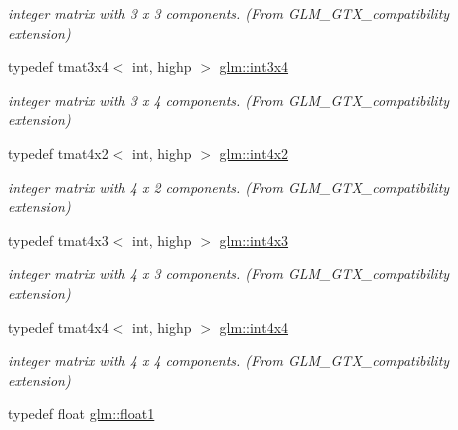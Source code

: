 \begin{DoxyCompactItemize}
\begin{DoxyCompactList}\small\item\em integer matrix with 3 x 3 components. (From G\-L\-M\-\_\-\-G\-T\-X\-\_\-compatibility extension) \end{DoxyCompactList}\item 
\hypertarget{group__gtx__compatibility_ga7500192cce87fb3a48f7119d6646af5a}{typedef tmat3x4$<$ int, highp $>$ \hyperlink{group__gtx__compatibility_ga7500192cce87fb3a48f7119d6646af5a}{glm\-::int3x4}}\label{group__gtx__compatibility_ga7500192cce87fb3a48f7119d6646af5a}

\begin{DoxyCompactList}\small\item\em integer matrix with 3 x 4 components. (From G\-L\-M\-\_\-\-G\-T\-X\-\_\-compatibility extension) \end{DoxyCompactList}\item 
\hypertarget{group__gtx__compatibility_ga91c24f1a2df5d20ea98f97ec243782c3}{typedef tmat4x2$<$ int, highp $>$ \hyperlink{group__gtx__compatibility_ga91c24f1a2df5d20ea98f97ec243782c3}{glm\-::int4x2}}\label{group__gtx__compatibility_ga91c24f1a2df5d20ea98f97ec243782c3}

\begin{DoxyCompactList}\small\item\em integer matrix with 4 x 2 components. (From G\-L\-M\-\_\-\-G\-T\-X\-\_\-compatibility extension) \end{DoxyCompactList}\item 
\hypertarget{group__gtx__compatibility_ga08b035f86b94428f5913e48a4a074e97}{typedef tmat4x3$<$ int, highp $>$ \hyperlink{group__gtx__compatibility_ga08b035f86b94428f5913e48a4a074e97}{glm\-::int4x3}}\label{group__gtx__compatibility_ga08b035f86b94428f5913e48a4a074e97}

\begin{DoxyCompactList}\small\item\em integer matrix with 4 x 3 components. (From G\-L\-M\-\_\-\-G\-T\-X\-\_\-compatibility extension) \end{DoxyCompactList}\item 
\hypertarget{group__gtx__compatibility_ga1e72ab0f7e57aae3d07ef8880c11d8b7}{typedef tmat4x4$<$ int, highp $>$ \hyperlink{group__gtx__compatibility_ga1e72ab0f7e57aae3d07ef8880c11d8b7}{glm\-::int4x4}}\label{group__gtx__compatibility_ga1e72ab0f7e57aae3d07ef8880c11d8b7}

\begin{DoxyCompactList}\small\item\em integer matrix with 4 x 4 components. (From G\-L\-M\-\_\-\-G\-T\-X\-\_\-compatibility extension) \end{DoxyCompactList}\item 
\hypertarget{group__gtx__compatibility_gae0ad1b0450320cda98bbbecb56bc3167}{typedef float \hyperlink{group__gtx__compatibility_gae0ad1b0450320cda98bbbecb56bc3167}{glm\-::float1}}\label{group__gtx__compatibility_gae0ad1b0450320cda98bbbecb56bc3167}


\end{DoxyCompactItemize}
